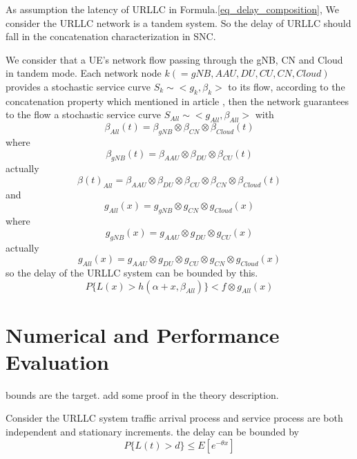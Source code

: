 \documentclass[conference]{IEEEtran}
\begin{document}
As assumption the latency of URLLC in Formula.\ref{eq_delay_composition},  We consider the URLLC network is a tandem system. So the delay of URLLC should fall in the concatenation characterization in SNC.

We consider that a UE's network flow passing through the gNB, CN and Cloud in tandem mode. Each network node $k(=gNB, AAU, DU, CU, CN, Cloud)$ provides a stochastic service curve $S_{k}\sim<g_k, \beta_k>$ to its flow, according to the concatenation property which mentioned in article \cite{b4}, then the network guarantees to the flow a stochastic service curve $S_{All}\sim<g_{All},\beta_{All}>$ with
\begin{equation}\label{eq_tandem_ssc}
\beta_{All}(t)=\beta_{gNB}\otimes\beta_{CN}\otimes\beta_{Cloud}(t)
\end{equation}
where
\begin{equation}\label{eq_tandem_gNB}
\beta_{gNB}(t)=\beta_{AAU}\otimes\beta_{DU}\otimes\beta_{CU}(t)
\end{equation}
actually
\begin{equation}\label{eq_tandem_sscFull}
\beta(t)_{All}=\beta_{AAU}\otimes\beta_{DU}\otimes\beta_{CU}\otimes\beta_{CN}\otimes\beta_{Cloud}(t)
\end{equation}
and
\begin{equation}\label{eq_tandem_ssc_bound}
g_{All}(x)=g_{gNB}\otimes g_{CN}\otimes g_{Cloud}(x)
\end{equation}
where
\begin{equation}\label{eq_tandem_gNB_bound}
g_{gNB}(x)=g_{AAU}\otimes g_{DU}\otimes g_{CU}(x)
\end{equation}
actually
\begin{equation}\label{eq_tandem_ssc_bound}
g_{All}(x)=g_{AAU}\otimes g_{DU}\otimes g_{CU}\otimes g_{CN}\otimes g_{Cloud}(x)
\end{equation}
so the delay of the URLLC system can be bounded by this.
\begin{equation}\label{eq_tandem_urllc_bound}
P\{L(x)>h(\alpha+x, \beta_{All})\} < f \otimes g_{All}(x)
\end{equation}


\section{Numerical and Performance Evaluation}

bounds are the target.
add some proof in the theory description.

Consider the URLLC system traffic arrival process and service process are both independent and stationary increments. the delay can be bounded by
\begin{equation}
P\{L(t)>d\} \leq E[e^{-\theta x}]
\end{equation}
\end{document}
